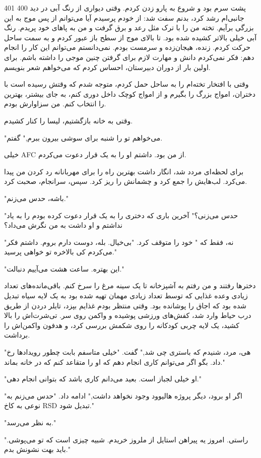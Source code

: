 401
400
پشت سرم بود و شروع به پارو زدن کردم. وقتی دیواری از رنگ آبی در دید جانبی‌ام رشد کرد، بدنم سفت شد: از خودم پرسیدم آیا می‌توانم از پس موج به این بزرگی برآیم. تخته من را با ترک مثل رعد و برق گرفت و من به پاهای خود پریدم. رنگ آبی خیلی بالاتر کشیده شده بود. تا بالای موج از سطح باز عبور کردم و به سمت ساحل حرکت کردم. زنده، هیجان‌زده و سرمست بودم. نمی‌دانستم می‌توانم این کار را انجام دهم: فکر نمی‌کردم دانش و مهارت لازم برای گرفتن چنین موجی را داشته باشم. برای اولین بار از دوران دبیرستان، احساس کردم که می‌خواهم شعر بنویسم. 

وقتی با افتخار تخته‌ام را به ساحل حمل کردم، متوجه شدم که وقتش رسیده است با دختران، امواج بزرگ را بگیرم و از امواج کوچک داخل دوری کنم، به جای بیشتر، بهترین را انتخاب کنم. من سزاوارش بودم.

وقتی به خانه بازگشتیم، لیسا را کنار کشیدم.

"می‌خواهم تو را شنبه برای سوشی بیرون ببرم," گفتم.

خیلی AFC از من بود. داشتم او را به یک قرار دعوت می‌کردم.

برای لحظه‌ای مردد شد، انگار داشت بهترین راه را برای مهربانانه رد کردن من پیدا می‌کرد. لب‌هایش را جمع کرد و چشمانش را ریز کرد. سپس، سرانجام، صحبت کرد.

"باشه، حدس می‌زنم." 

"حدس می‌زنی؟" آخرین باری که دختری را به یک قرار دعوت کرده بودم را به یاد نداشتم و او داشت به من نگرش می‌داد؟

"نه، فقط که " خود را متوقف کرد. "بی‌خیال. بله، دوست دارم بروم. داشتم فکر می‌کردم کی بالاخره تو خواهی پرسید."

"این بهتره. ساعت هشت می‌آییم دنبالت."

دخترها رفتند و من رفتم به آشپزخانه تا یک سینه مرغ را سرخ کنم. باقی‌مانده‌های تعداد زیادی وعده غذایی که توسط تعداد زیادی مهمان تهیه شده بود به یک لایه سیاه تبدیل شده بود که اجاق را پوشانده بود. وقتی منتظر بودم غذایم بپزد، تایلر دردن از طریق درب حیاط وارد شد، کفش‌های ورزشی پوشیده و واکمن روی سر. تی‌شرت‌اش را بالا کشید، یک لایه چربی کودکانه را روی شکمش بررسی کرد، و هدفون واکمن‌اش را برداشت.

"هی، مرد، شنیدم که باستری چی شد," گفت. "خیلی متاسفم بابت چطور رویدادها رخ داد. بگو اگر می‌توانم کاری انجام دهم که او را متقاعد کنم که در خانه بماند."

"او خیلی لجباز است. بعید می‌دانم کاری باشد که بتوانی انجام دهی."

"اگر او برود، دیگر پروژه هالیوود وجود نخواهد داشت," ادامه داد. "حدس می‌زنم به نوعی به کاخ RSD تبدیل شود."

"به نظر می‌رسد." 

"راستی. امروز یه پیراهن استایل از ملروز خریدم. شبیه چیزی است که تو می‌پوشی. باید بهت نشونش بدم."